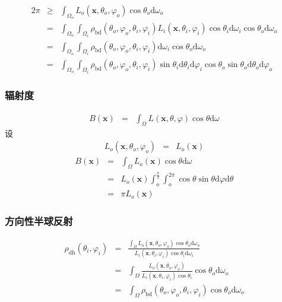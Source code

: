 \documentclass{beamer}
\newcommand{\mathd}{\mathrm{d}}
\newcommand{\tmmathbf}[1]{\ensuremath{\boldsymbol{#1}}}
\newcommand{\tmop}[1]{\ensuremath{\operatorname{#1}}}
\begin{document}
{{\begin{frame}
  \frametitle{}
  \begin{eqnarray*}
    2 \pi & \geqslant & \int_{\Omega_o} L_o (\tmmathbf{x}, \theta_o,
    \varphi_o) \cos \theta_o \mathd \omega_o\\
    & = & \int_{\Omega_o} \int_{\Omega_i} \rho_{\tmop{bd}} (\theta_o,
    \varphi_o, \theta_i, \varphi_i) L_i (\tmmathbf{x}, \theta_i, \varphi_i)
    \cos \theta_i \mathd \omega_i \cos \theta_o \mathd \omega_o\\
    & = & \int_{\Omega_o} \int_{\Omega_i} \rho_{\tmop{bd}} (\theta_o,
    \varphi_o, \theta_i, \varphi_i) \mathd \omega_i \cos \theta_o \mathd
    \omega_o\\
    & = & \int_{\Omega_o} \int_{\Omega_i} \rho_{\tmop{bd}} (\theta_o,
    \varphi_o, \theta_i, \varphi_i) \sin \theta_i \mathd \theta_i \mathd
    \varphi_i \cos \theta_o \sin \theta_o \mathd \theta_o \mathd \varphi_o
  \end{eqnarray*}
  
\end{frame}

\begin{frame}
  \frametitle{辐射度}
  \begin{eqnarray*}
    B (\tmmathbf{x}) & = & \int_{\Omega} L (\tmmathbf{x}, \theta, \varphi)
    \cos \theta \mathd \omega
  \end{eqnarray*}
  设
  \begin{eqnarray*}
    L_o (\tmmathbf{x}, \theta_o, \varphi_o) & = & L_o (\tmmathbf{x})
  \end{eqnarray*}
  \begin{eqnarray*}
    B (\tmmathbf{x}) & = & \int_{\Omega} L_o (\tmmathbf{x}) \cos \theta \mathd
    \omega\\
    & = & L_o (\tmmathbf{x}) \int_o^{\frac{\pi}{2}} \int_o^{2 \pi} \cos
    \theta \sin \theta \mathd \varphi \mathd \theta\\
    & = & \pi L_o (\tmmathbf{x})
  \end{eqnarray*}
\end{frame}

\begin{frame}
  \frametitle{方向性半球反射}
  \begin{eqnarray*}
    \rho_{\tmop{dh}} (\theta_i, \varphi_i) & = & \frac{\int_{\Omega} L_o
    (\tmmathbf{x}, \theta_o, \varphi_o) \cos \theta_o \mathd \omega_o}{L_i
    (\tmmathbf{x}, \theta_i, \varphi_i) \cos \theta_i \mathd \omega_i}\\
    & = & \int_{\Omega} \frac{L_o (\tmmathbf{x}, \theta_o, \varphi_o)}{L_i
    (\tmmathbf{x}, \theta_i, \varphi_i) \cos \theta_i} \cos \theta_o \mathd
    \omega_o\\
    & = & \int_{\Omega} \rho_{\tmop{bd}} (\theta_o, \varphi_o, \theta_i,
    \varphi_i) \cos \theta_o \mathd \omega_o
  \end{eqnarray*}
  

\end{frame}}}
\end{document}

